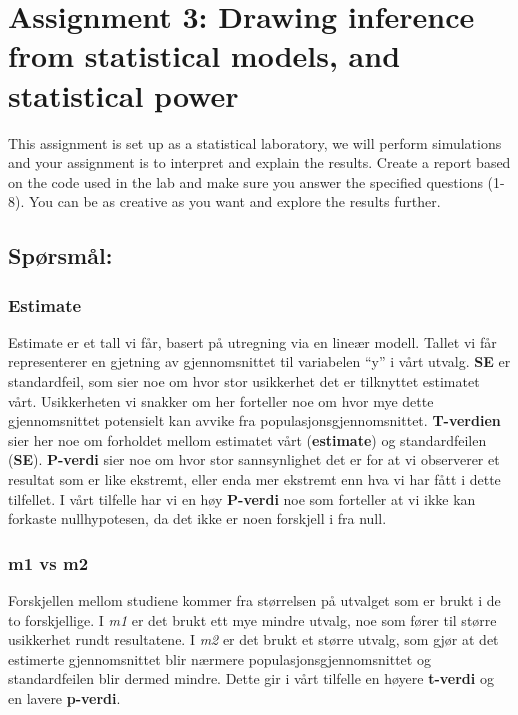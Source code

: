 \documentclass[
  letterpaper,
  DIV=11,
  numbers=noendperiod]{scrreprt}
\begin{document}

\chapter{Assignment 3: Drawing inference from statistical models, and
statistical power}\label{assignment3}

This assignment is set up as a statistical laboratory, we will perform
simulations and your assignment is to interpret and explain the results.
Create a report based on the code used in the lab and make sure you
answer the specified questions (1-8). You can be as creative as you want
and explore the results further.

\section{Spørsmål:}\label{spuxf8rsmuxe5l}

\subsection{Estimate}\label{estimate}

Estimate er et tall vi får, basert på utregning via en lineær modell.
Tallet vi får representerer en gjetning av gjennomsnittet til variabelen
``y'' i vårt utvalg. \textbf{SE} er standardfeil, som sier noe om hvor
stor usikkerhet det er tilknyttet estimatet vårt. Usikkerheten vi
snakker om her forteller noe om hvor mye dette gjennomsnittet potensielt
kan avvike fra populasjonsgjennomsnittet. \textbf{T-verdien} sier her
noe om forholdet mellom estimatet vårt (\textbf{estimate}) og
standardfeilen (\textbf{SE}). \textbf{P-verdi} sier noe om hvor stor
sannsynlighet det er for at vi observerer et resultat som er like
ekstremt, eller enda mer ekstremt enn hva vi har fått i dette tilfellet.
I vårt tilfelle har vi en høy \textbf{P-verdi} noe som forteller at vi
ikke kan forkaste nullhypotesen, da det ikke er noen forskjell i fra
null.

\subsection{m1 vs m2}\label{m1-vs-m2}

Forskjellen mellom studiene kommer fra størrelsen på utvalget som er
brukt i de to forskjellige. I \emph{m1} er det brukt ett mye mindre
utvalg, noe som fører til større usikkerhet rundt resultatene. I
\emph{m2} er det brukt et større utvalg, som gjør at det estimerte
gjennomsnittet blir nærmere populasjonsgjennomsnittet og standardfeilen
blir dermed mindre. Dette gir i vårt tilfelle en høyere \textbf{t-verdi}
og en lavere \textbf{p-verdi}.
\end{document}
